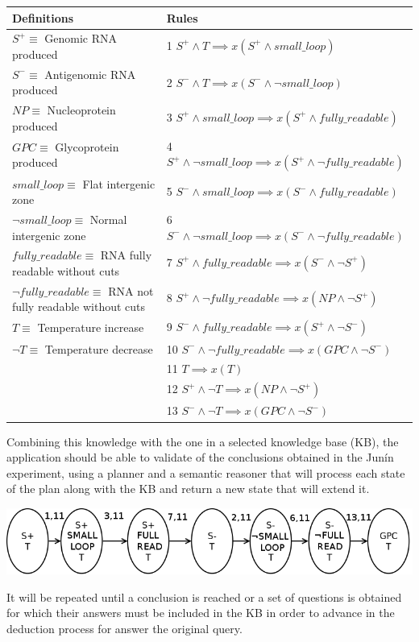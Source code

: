 \documentclass[portrait,final,a0paper,fontscale=0.277]{baposter}
\begin{document}
\begin{poster}
{{	\resizebox{\linewidth}{!} {
  	\begin{tabular}{l l}
	Definitions								& Rules\\
	\hline
	$S^{+}\equiv$ Genomic RNA produced 
	& 1  $S^{+}\wedge T\implies x(S^{+}\wedge small\_loop)$ \\
	$S^{-}\equiv$ Antigenomic RNA produced 	
	& 2  $S^{-}\wedge T\implies x(S^{-}\wedge\neg small\_loop)$\\
	$NP\equiv$ Nucleoprotein produced 		
	& 3  $S^{+}\wedge small\_loop\implies x(S^{+}\wedge fully\_readable)$\\
	$GPC\equiv$ Glycoprotein produced 		
	& 4  $S^{+}\wedge\neg small\_loop\implies x(S^{+}\wedge\neg fully\_readable)$\\
	$small\_loop\equiv$ Flat intergenic zone 
	& 5  $S^{-}\wedge small\_loop\implies x(S^{-}\wedge fully\_readable)$\\
	$\neg small\_loop\equiv$ Normal intergenic zone 
	& 6  $S^{-}\wedge\neg small\_loop\implies x(S^{-}\wedge\neg fully\_readable)$\\
	$fully\_readable\equiv$ RNA fully readable without cuts 
	& 7  $S^{+}\wedge fully\_readable\implies x(S^{-}\wedge\neg S^{+})$\\
	$\neg fully\_readable\equiv$ RNA not fully readable without cuts 
	& 8  $S^{+}\wedge\neg fully\_readable\implies x(NP\wedge\neg S^{+})$\\
	$T\equiv$ Temperature increase
	& 9  $S^{-}\wedge fully\_readable\implies x(S^{+}\wedge\neg S^{-})$ \\
	$\neg T\equiv$ Temperature decrease 
	& 10 $S^{-}\wedge\neg fully\_readable\implies x(GPC\wedge\neg S^{-})$\\
	& 11 $T\implies x(T)$\\
	& 12 $S^{+}\wedge\neg T\implies x(NP\wedge\neg S^{+})$\\
	& 13 $S^{-}\wedge\neg T\implies x(GPC\wedge\neg S^{-})$\\
	\end{tabular}
    }
    \begin{flushleft}
	Combining this knowledge with the one in a selected knowledge base (KB), 
	the application should be able to validate of the conclusions obtained 
	in the Junín experiment\cite{Junin}, using a planner and a semantic 
	reasoner that will process each state of the plan along with the KB and 
	return a new state that will extend it.
	\end{flushleft}
    \begin{center}
	\includegraphics[width=0.85\linewidth]{1st_approach_1}
	\end{center}
	\begin{flushleft}
	It will be repeated until a conclusion is reached or a set of questions 
	is obtained for which their answers must be included in the KB in order 
	to advance in the deduction process for answer the original query.
	\end{flushleft}
	}
   }
   

\end{poster}
\end{document}
